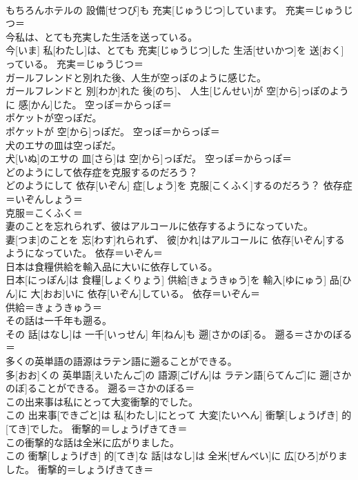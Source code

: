 \documentclass[8pt]{extreport}
\begin{document}
\begin{CJK}{UTF8}{min}
\\	もちろんホテルの 設備[せつび]も 充実[じゅうじつ]しています。	充実＝じゅうじつ＝ 
\\	今私は、とても充実した生活を送っている。	
\\	今[いま] 私[わたし]は、とても 充実[じゅうじつ]した 生活[せいかつ]を 送[おく]っている。	充実＝じゅうじつ＝ 
\\	ガールフレンドと別れた後、人生が空っぽのように感じた。	
\\	ガールフレンドと 別[わか]れた 後[のち]、 人生[じんせい]が 空[から]っぽのように 感[かん]じた。	空っぽ＝からっぽ＝ 
\\	ポケットが空っぽだ。	
\\	ポケットが 空[から]っぽだ。	空っぽ＝からっぽ＝ 
\\	犬のエサの皿は空っぽだ。	
\\	犬[いぬ]のエサの 皿[さら]は 空[から]っぽだ。	空っぽ＝からっぽ＝ 
\\	どのようにして依存症を克服するのだろう？	
\\	どのようにして 依存[いぞん] 症[しょう]を 克服[こくふく]するのだろう？	依存症＝いぞんしょう＝ 
\\	克服＝こくふく＝ 
\\	妻のことを忘れられず、彼はアルコールに依存するようになっていた。	
\\	妻[つま]のことを 忘[わす]れられず、 彼[かれ]はアルコールに 依存[いぞん]するようになっていた。	依存＝いぞん＝ 
\\	日本は食糧供給を輸入品に大いに依存している。	
\\	日本[にっぽん]は 食糧[しょくりょう] 供給[きょうきゅう]を 輸入[ゆにゅう] 品[ひん]に 大[おお]いに 依存[いぞん]している。	依存＝いぞん＝ 
\\	供給＝きょうきゅう＝ 
\\	その話は一千年も遡る。	
\\	その 話[はなし]は 一千[いっせん] 年[ねん]も 遡[さかのぼ]る。	遡る＝さかのぼる＝ 
\\	多くの英単語の語源はラテン語に遡ることができる。	
\\	多[おお]くの 英単語[えいたんご]の 語源[ごげん]は ラテン語[らてんご]に 遡[さかのぼ]ることができる。	遡る＝さかのぼる＝ 
\\	この出来事は私にとって大変衝撃的でした。	
\\	この 出来事[できごと]は 私[わたし]にとって 大変[たいへん] 衝撃[しょうげき] 的[てき]でした。	衝撃的＝しょうげきてき＝ 
\\	この衝撃的な話は全米に広がりました。	
\\	この 衝撃[しょうげき] 的[てき]な 話[はなし]は 全米[ぜんべい]に 広[ひろ]がりました。	衝撃的＝しょうげきてき＝ 

\end{CJK}
\end{document}
